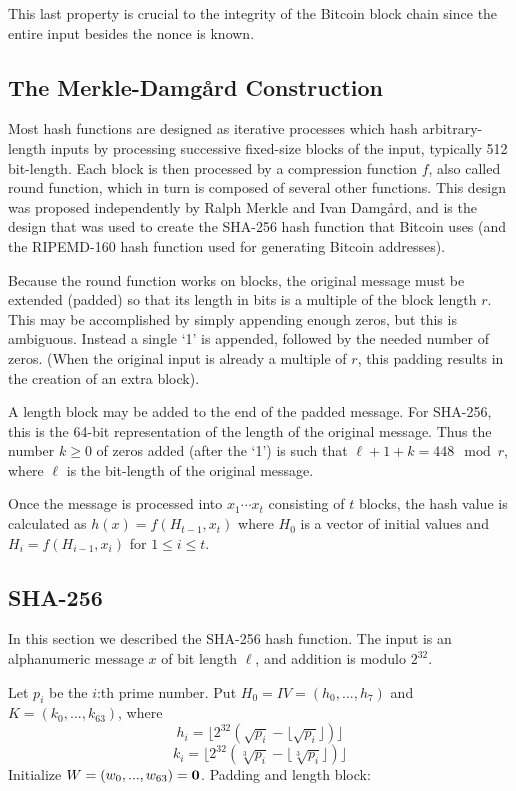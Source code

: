 \documentclass[a4paper,12pt]{article}
\begin{document}
This last property is crucial to the integrity of the Bitcoin block chain since the entire input besides the nonce is known.

\subsection{The Merkle-Damg\aa rd Construction}

Most hash functions are designed as iterative processes which hash arbitrary-length inputs by processing successive fixed-size blocks of the input, typically 512 bit-length. \cite[p. 80]{schneier} Each block is then processed by a compression function $f$, also called round function, which in turn is composed of several other functions. This design was proposed independently by Ralph Merkle and Ivan Damg\aa rd, and is the design that was used to create the SHA-256 hash function that Bitcoin uses (and the RIPEMD-160 hash function used for generating Bitcoin addresses).

Because the round function works on blocks, the original message must be extended (padded) so that its length in bits is a multiple of the block length $r$. This may be accomplished by simply appending enough zeros, but this is ambiguous. Instead a single `1' is appended, followed by the needed number of zeros. (When the original input is already a multiple of $r$, this padding results in the creation of an extra block).

A length block may be added to the end of the padded message. For SHA-256, this is the 64-bit representation of the length of the original message. Thus the number $k \geq 0$ of zeros added (after the `1') is such that $\ell+1+k = 448 \mod r$, where $\ell$ is the bit-length of the original message.

Once the message is processed into $x_1 \cdots x_t$ consisting of $t$ blocks, the hash value is calculated as $h(x) = f(H_{t-1},x_t)$ where $H_0$ is a vector of initial values and $H_i = f(H_{i-1},x_i)$ for $1 \leq i \leq t$. \cite[p. 333]{menezes}

\subsection{SHA-256}

In this section we described the SHA-256 hash function. \cite{fips} The input is an alphanumeric message $x$ of bit length $\ell$, and addition is modulo $2^{32}$.

Let $p_i$ be the $i$:th prime number. Put $H_0 = IV = (h_0,...,h_7)$ and $K = (k_0,...,k_{63})$, where
$$h_i = \lfloor2^{32}(\sqrt{p_i}-\lfloor\sqrt{p_i} \rfloor)\rfloor$$
$$k_i = \lfloor2^{32}(\sqrt[3]{p_i}-\lfloor\sqrt[3]{p_i} \rfloor)\rfloor$$
Initialize $W = (w_0,...,w_{63}) = \bold{0}$.
\newline
\newline
\noindent
Padding and length block:
\end{document}
